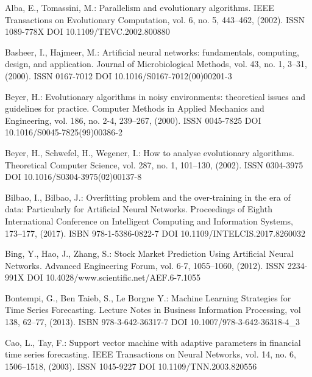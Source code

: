 
\begin{thebibliography}{99.}

 Alba, E., Tomassini, M.: Parallelism and evolutionary algorithms. IEEE Transactions on Evolutionary Computation, vol. 6, no. 5, 443--462, (2002). ISSN 1089-778X DOI 10.1109/TEVC.2002.800880

 Basheer, I., Hajmeer, M.: Artificial neural networks: fundamentals, computing, design, and application. Journal of Microbiological Methods, vol. 43, no. 1, 3--31, (2000). ISSN 0167-7012 DOI 10.1016/S0167-7012(00)00201-3

 Beyer, H.: Evolutionary algorithms in noisy environments: theoretical issues and guidelines for practice. Computer Methods in Applied Mechanics and Engineering, vol. 186, no. 2-4, 239--267, (2000). ISSN 0045-7825 DOI 10.1016/S0045-7825(99)00386-2

 Beyer, H., Schwefel, H., Wegener, I.: How to analyse evolutionary algorithms. Theoretical Computer Science, vol. 287, no. 1, 101--130, (2002). ISSN 0304-3975 DOI 10.1016/S0304-3975(02)00137-8

 Bilbao, I., Bilbao, J.: Overfitting problem and the over-training in the era of data: Particularly for Artificial Neural Networks. Proceedings of Eighth International Conference on Intelligent Computing and Information Systems, 173--177, (2017). ISBN 978-1-5386-0822-7 DOI 10.1109/INTELCIS.2017.8260032

 Bing, Y., Hao, J., Zhang, S.: Stock Market Prediction Using Artificial Neural Networks. Advanced Engineering Forum, vol. 6-7, 1055--1060, (2012). ISSN 2234-991X DOI 10.4028/www.scientific.net/AEF.6-7.1055

 Bontempi, G., Ben Taieb, S., Le Borgne Y.: Machine Learning Strategies for Time Series Forecasting. Lecture Notes in Business Information Processing, vol 138, 62--77, (2013). ISBN 978-3-642-36317-7 DOI 10.1007/978-3-642-36318-4\_3

 Cao, L., Tay, F.: Support vector machine with adaptive parameters in financial time series forecasting. IEEE Transactions on Neural Networks, vol. 14, no. 6, 1506--1518, (2003). ISSN 1045-9227 DOI 10.1109/TNN.2003.820556


\end{thebibliography}
